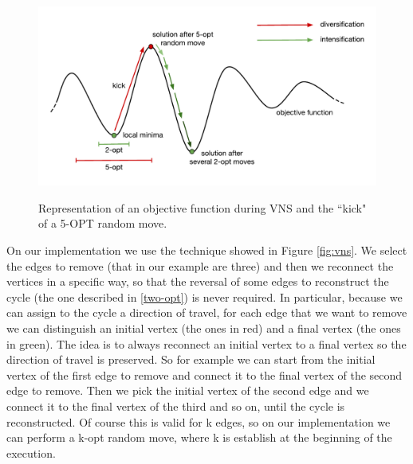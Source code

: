 \begin{figure}[h!]
\centering
	\includegraphics[scale=0.77]{media/vns_graph.pdf} \\
	\caption{Representation of an objective function during VNS and the ``kick" of a 5-OPT random move.}
\end{figure}

\noindent On our implementation we use the technique showed in Figure \ref{fig:vns}. We select the edges to remove (that in our example are three) and then we reconnect the vertices in a specific way, so that the reversal of some edges to reconstruct the cycle (the one described in \ref{two-opt}) is never required. In particular, because we can assign to the cycle a direction of travel, for each edge that we want to remove we can distinguish an initial vertex (the ones in red) and a final vertex (the ones in green). The idea is to always reconnect an initial vertex to a final vertex so the direction of travel is preserved. So for example we can start from the initial vertex of the first edge to remove and connect it to the final vertex of the second edge to remove. Then we pick the initial vertex of the second edge and we connect it to the final vertex of the third and so on, until the cycle is reconstructed. Of course this is valid for k edges, so on our implementation we can perform a k-opt random move, where k is establish at the beginning of the execution.

